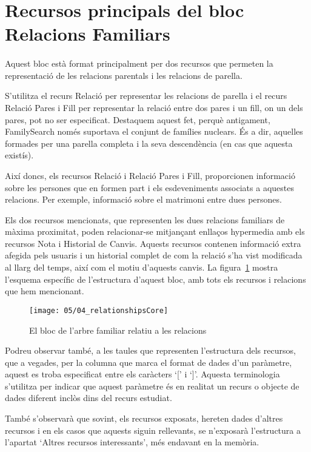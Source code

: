 \section{Recursos principals del bloc Relacions Familiars}

    \paragraph{}
    Aquest bloc està format principalment per dos recursos que permeten la representació de les relacions parentals i les relacions de parella.

    S'utilitza el recurs Relació per representar les relacions de parella i el recurs Relació Pares i Fill per representar la relació entre dos pares i un fill, on un dels pares, pot no ser especificat. Destaquem aquest fet, perquè antigament, FamilySearch només suportava el conjunt de famílies nuclears. És a dir, aquelles formades per una parella completa i la seva descendència (en cas que aquesta existís).

    Així doncs, els recursos Relació i Relació Pares i Fill, proporcionen informació sobre les persones que en formen part i els esdeveniments associats a aquestes relacions. Per exemple, informació sobre el matrimoni entre dues persones.

    Els dos recursos mencionats, que representen les dues relacions familiars de mà\-xi\-ma proximitat, poden relacionar-se mitjançant enllaços hypermedia amb els recursos Nota i Historial de Canvis. Aquests recursos contenen informació extra afegida pels usuaris i un historial complet de com la relació s'ha vist modificada al llarg del temps, així com el motiu d'aquests canvis. La figura~\ref{img:relationshipsBloc} mostra l'esquema específic de l'estructura d'aquest bloc, amb tots els recursos i relacions que hem mencionant.

    \begin{figure}[h]
        \texttt{[image: 05/04\_relationshipsCore]}
        \centering
        \caption{El bloc de l'arbre familiar relatiu a les relacions}\label{img:relationshipsBloc}
    \end{figure}

    Podreu observar també, a les taules que representen l'estructura dels recursos, que a vegades, per la columna que marca el format de dades d'un paràmetre, aquest es troba especificat entre els caràcters `[' i `]'. Aquesta terminologia s'utilitza per indicar que aquest paràmetre és en realitat un recurs o objecte de dades diferent inclòs dins del recurs estudiat.

    També s'observarà que sovint, els recursos exposats, hereten dades d'altres recursos i en els casos que aquests siguin rellevants, se n'exposarà l'estructura a l'apartat `Altres recursos interessants', més endavant en la memòria.

    
    
